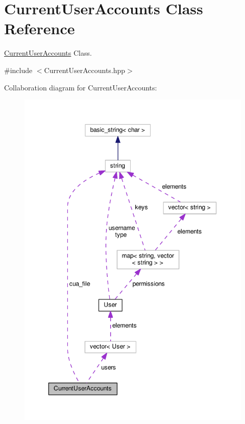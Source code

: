 \hypertarget{class_current_user_accounts}{\section{Current\-User\-Accounts Class Reference}
\label{class_current_user_accounts}
}


\hyperlink{class_current_user_accounts}{Current\-User\-Accounts} Class.  




{\ttfamily \#include $<$Current\-User\-Accounts.\-hpp$>$}



Collaboration diagram for Current\-User\-Accounts\-:
\nopagebreak
\begin{figure}[H]
\begin{center}
\leavevmode
\includegraphics[width=350pt]{class_current_user_accounts__coll__graph}
\end{center}
\end{figure}
